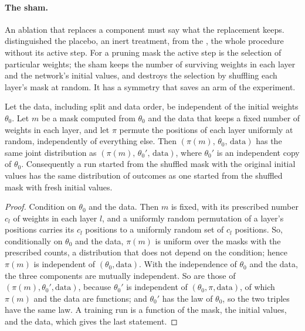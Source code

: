 \begin{refsection}
\paragraph{The sham.} An ablation that replaces a component must say what the replacement keeps.  distinguished the placebo, an inert treatment, from the , the whole procedure without its active step. For a pruning mask the active step is the selection of particular weights; the sham keeps the number of surviving weights in each layer and the network's initial values, and destroys the selection by shuffling each layer's mask at random. It has a symmetry that saves an arm of the experiment.

\begin{proposition}\label{prop:ablations:sham}
Let the data, including split and data order, be independent of the initial weights $\theta_0$. Let $m$ be a mask computed from $\theta_0$ and the data that keeps a fixed number of weights in each layer, and let $\pi$ permute the positions of each layer uniformly at random, independently of everything else. Then $(\pi(m),\,\theta_0,\,\text{data})$ has the same joint distribution as $(\pi(m),\,\theta_0',\,\text{data})$, where $\theta_0'$ is an independent copy of $\theta_0$. Consequently a run started from the shuffled mask with the original initial values has the same distribution of outcomes as one started from the shuffled mask with fresh initial values.
\end{proposition}

\begin{proof}
Condition on $\theta_0$ and the data. Then $m$ is fixed, with its prescribed number $c_l$ of weights in each layer $l$, and a uniformly random permutation of a layer's positions carries its $c_l$ positions to a uniformly random set of $c_l$ positions. So, conditionally on $\theta_0$ and the data, $\pi(m)$ is uniform over the masks with the prescribed counts, a distribution that does not depend on the condition; hence $\pi(m)$ is independent of $(\theta_0,\text{data})$. With the independence of $\theta_0$ and the data, the three components are mutually independent. So are those of $(\pi(m),\theta_0',\text{data})$, because $\theta_0'$ is independent of $(\theta_0,\pi,\text{data})$, of which $\pi(m)$ and the data are functions; and $\theta_0'$ has the law of $\theta_0$, so the two triples have the same law. A training run is a function of the mask, the initial values, and the data, which gives the last statement.
\end{proof}


\end{refsection}

